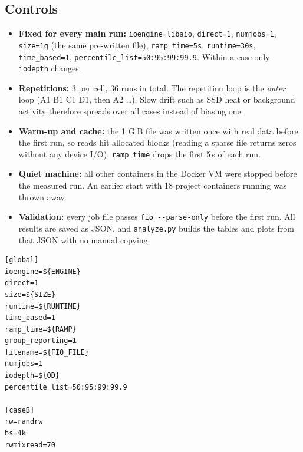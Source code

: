 \documentclass[11pt,a4paper]{article}
\begin{document}
\subsection{Controls}

\begin{itemize}
  \item \textbf{Fixed for every main run:} \texttt{ioengine=libaio}, \texttt{direct=1}, \texttt{numjobs=1},
    \texttt{size=1g} (the same pre-written file), \texttt{ramp\_time=5s}, \texttt{runtime=30s},
    \texttt{time\_based=1}, \texttt{percentile\_list=50:95:99:99.9}. Within a case only \texttt{iodepth} changes.
  \item \textbf{Repetitions:} 3 per cell, 36 runs in total. The repetition loop is the \emph{outer}
    loop (A1 B1 C1 D1, then A2 \ldots). Slow drift such as SSD heat or background activity therefore spreads over all
    cases instead of biasing one.
  \item \textbf{Warm-up and cache:} the 1 GiB file was written once with real data before the first run, so
    reads hit allocated blocks (reading a sparse file returns zeros without any device I/O). \texttt{ramp\_time} drops the first 5\,s of each run.
  \item \textbf{Quiet machine:} all other containers in the Docker VM were stopped before the measured
    run. An earlier start with 18 project containers running was thrown away.
  \item \textbf{Validation:} every job file passes \texttt{fio -{}-parse-only} before the first run. All results are
    saved as JSON, and \texttt{analyze.py} builds the tables and plots from that JSON with no manual copying.
\end{itemize}

\begin{lstlisting}[caption={\texttt{jobs/B\_randrw70\_4k.fio} (header comment omitted). \texttt{run\_in\_container.sh} sets \texttt{ENGINE=libaio}, \texttt{SIZE=1g}, \texttt{RUNTIME=30}, \texttt{RAMP=5}, \texttt{FIO\_FILE=/fio-lab/db-test.bin} and \texttt{QD} $\in\{1,8,32\}$. The other cases differ only in \texttt{rw}, \texttt{bs} and \texttt{rwmixread}.}]
[global]
ioengine=${ENGINE}
direct=1
size=${SIZE}
runtime=${RUNTIME}
time_based=1
ramp_time=${RAMP}
group_reporting=1
filename=${FIO_FILE}
numjobs=1
iodepth=${QD}
percentile_list=50:95:99:99.9

[caseB]
rw=randrw
bs=4k
rwmixread=70
\end{lstlisting}

\end{document}
